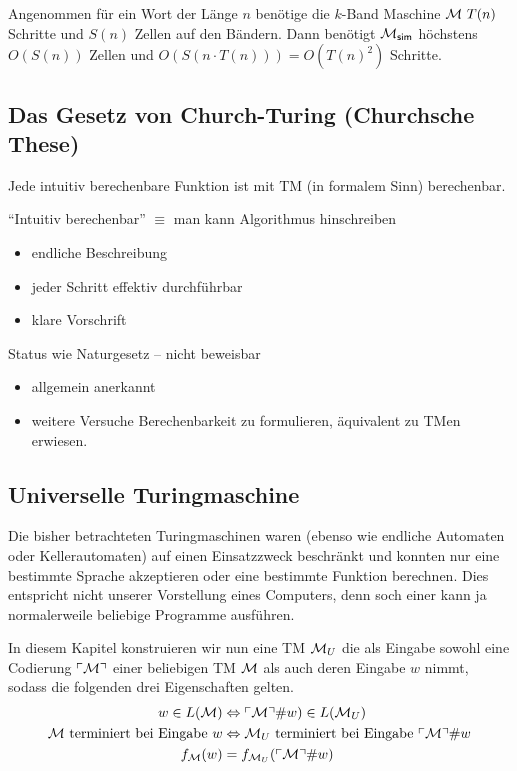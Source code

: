 \begin{Bemerkung}
	Angenommen für ein Wort der Länge $n$ benötige die $k$-Band Maschine $\mathcal{M}\ T(n)$ Schritte und $S(n)$ Zellen auf den Bändern.
	Dann benötigt $\mathcal{M}_\mathsf{sim}$ höchstens $O(S(n))$ Zellen und $O(S(n\cdot T(n)))=O(T(n)^2)$ Schritte.
\end{Bemerkung}

\subsection{Das Gesetz von Church-Turing (Churchsche These)} %
\begin{Satz}[name={[Intuitiv berechenbare Funktionen sind mit \acs*{TM} berechenbar]}]
	Jede intuitiv berechenbare Funktion ist mit \ac{TM} (in formalem Sinn) berechenbar.
	
	"`Intuitiv berechenbar"' $\equiv$ man kann Algorithmus hinschreiben
	\begin{itemize}
		\item endliche Beschreibung
		\item jeder Schritt effektiv durchführbar
		\item klare Vorschrift
	\end{itemize}
	Status wie Naturgesetz -- nicht beweisbar
	\begin{itemize}[label=\->]
		\item allgemein anerkannt
		\item weitere Versuche Berechenbarkeit zu formulieren, äquivalent zu \ac{TM}en erwiesen.
	\end{itemize}
\end{Satz}



\subsection{Universelle Turingmaschine}
Die bisher betrachteten Turingmaschinen waren (ebenso wie endliche Automaten oder Kellerautomaten) 
auf einen Einsatzzweck beschränkt und konnten nur eine bestimmte Sprache akzeptieren oder eine bestimmte Funktion berechnen.
Dies entspricht nicht unserer Vorstellung eines Computers, denn soch einer kann ja normalerweile beliebige Programme ausführen.

In diesem Kapitel konstruieren wir nun eine \ac{TM} $\mathcal{M}_U$ die als Eingabe sowohl
eine Codierung $\ulcorner \mathcal{M} \urcorner$ einer beliebigen \ac{TM} $\mathcal{M}$ als auch deren Eingabe $w$ nimmt, sodass die folgenden drei Eigenschaften gelten.
\begin{align}
	\label{Mu-eq-lang} w\in L(\mathcal{M}) &\Leftrightarrow \ulcorner \mathcal{M} \urcorner\#w) \in L(\mathcal{M}_U)\\ 
	\label{Mu-eq-term} \text{$\mathcal{M}$ terminiert bei Eingabe $w$} &\Leftrightarrow \text{$\mathcal{M}_U$ terminiert bei Eingabe $\ulcorner \mathcal{M} \urcorner\#w$}\\
	\label{Mu-eq-func} \text{$f_{\mathcal{M}}(w)$} &= \text{$f_{\mathcal{M}_U}(\ulcorner \mathcal{M} \urcorner\#w)$}
\end{align}


